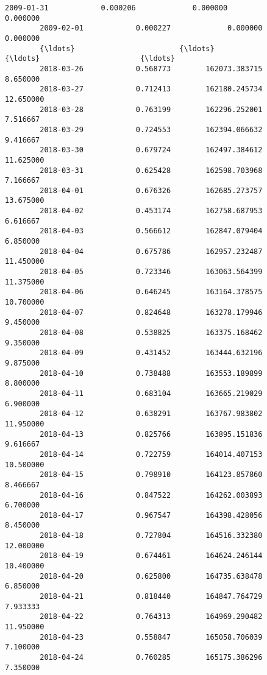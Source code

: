 \documentclass[11pt]{article}
\begin{document}
\begin{Verbatim}[commandchars=\\\{\}]
        2009-01-31            0.000206             0.000000                  0.000000   
        2009-02-01            0.000227             0.000000                  0.000000   
        {\ldots}                        {\ldots}                  {\ldots}                       {\ldots}   
        2018-03-26            0.568773        162073.383715                  8.650000   
        2018-03-27            0.712413        162180.245734                 12.650000   
        2018-03-28            0.763199        162296.252001                  7.516667   
        2018-03-29            0.724553        162394.066632                  9.416667   
        2018-03-30            0.679724        162497.384612                 11.625000   
        2018-03-31            0.625428        162598.703968                  7.166667   
        2018-04-01            0.676326        162685.273757                 13.675000   
        2018-04-02            0.453174        162758.687953                  6.616667   
        2018-04-03            0.566612        162847.079404                  6.850000   
        2018-04-04            0.675786        162957.232487                 11.450000   
        2018-04-05            0.723346        163063.564399                 11.375000   
        2018-04-06            0.646245        163164.378575                 10.700000   
        2018-04-07            0.824648        163278.179946                  9.450000   
        2018-04-08            0.538825        163375.168462                  9.350000   
        2018-04-09            0.431452        163444.632196                  9.875000   
        2018-04-10            0.738488        163553.189899                  8.800000   
        2018-04-11            0.683104        163665.219029                  6.900000   
        2018-04-12            0.638291        163767.983802                 11.950000   
        2018-04-13            0.825766        163895.151836                  9.616667   
        2018-04-14            0.722759        164014.407153                 10.500000   
        2018-04-15            0.798910        164123.857860                  8.466667   
        2018-04-16            0.847522        164262.003893                  6.700000   
        2018-04-17            0.967547        164398.428056                  8.450000   
        2018-04-18            0.727804        164516.332380                 12.000000   
        2018-04-19            0.674461        164624.246144                 10.400000   
        2018-04-20            0.625800        164735.638478                  6.850000   
        2018-04-21            0.818440        164847.764729                  7.933333   
        2018-04-22            0.764313        164969.290482                 11.950000   
        2018-04-23            0.558847        165058.706039                  7.100000   
        2018-04-24            0.760285        165175.386296                  7.350000   
        

\end{Verbatim}
\end{document}
